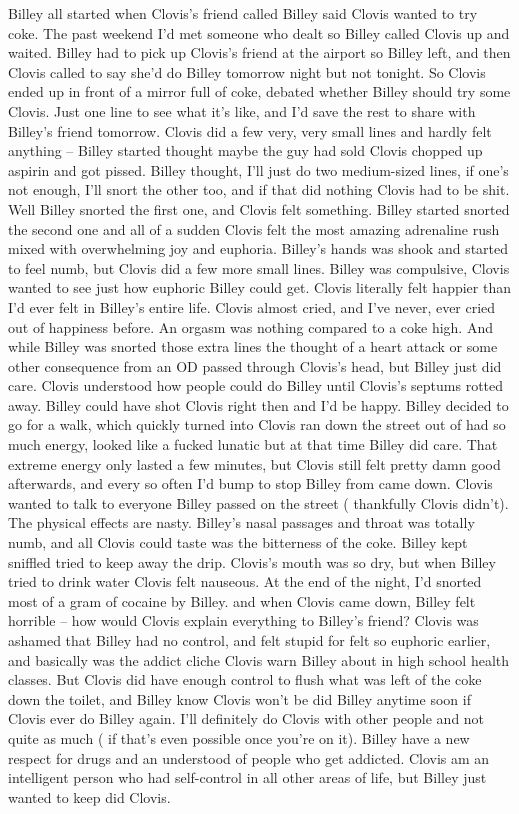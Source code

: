 \documentclass[12pt]{book}
\begin{document}
Billey all started when Clovis's friend called Billey said Clovis wanted to try coke. The past weekend I'd met someone who dealt so Billey called Clovis up and waited. Billey had to pick up Clovis's friend at the airport so Billey left, and then Clovis called to say she'd do Billey tomorrow night but not tonight. So Clovis ended up in front of a mirror full of coke, debated whether Billey should try some Clovis. Just one line to see what it's like, and I'd save the rest to share with Billey's friend tomorrow. Clovis did a few very, very small lines and hardly felt anything -- Billey started thought maybe the guy had sold Clovis chopped up aspirin and got pissed. Billey thought, I'll just do two medium-sized lines, if one's not enough, I'll snort the other too, and if that did nothing Clovis had to be shit. Well Billey snorted the first one, and Clovis felt something. Billey started snorted the second one and all of a sudden Clovis felt the most amazing adrenaline rush mixed with overwhelming joy and euphoria. Billey's hands was shook and started to feel numb, but Clovis did a few more small lines. Billey was compulsive, Clovis wanted to see just how euphoric Billey could get. Clovis literally felt happier than I'd ever felt in Billey's entire life. Clovis almost cried, and I've never, ever cried out of happiness before. An orgasm was nothing compared to a coke high. And while Billey was snorted those extra lines the thought of a heart attack or some other consequence from an OD passed through Clovis's head, but Billey just did care. Clovis understood how people could do Billey until Clovis's septums rotted away. Billey could have shot Clovis right then and I'd be happy. Billey decided to go for a walk, which quickly turned into Clovis ran down the street out of had so much energy, looked like a fucked lunatic but at that time Billey did care. That extreme energy only lasted a few minutes, but Clovis still felt pretty damn good afterwards, and every so often I'd bump to stop Billey from came down. Clovis wanted to talk to everyone Billey passed on the street ( thankfully Clovis didn't). The physical effects are nasty. Billey's nasal passages and throat was totally numb, and all Clovis could taste was the bitterness of the coke. Billey kept sniffled tried to keep away the drip. Clovis's mouth was so dry, but when Billey tried to drink water Clovis felt nauseous. At the end of the night, I'd snorted most of a gram of cocaine by Billey. and when Clovis came down, Billey felt horrible -- how would Clovis explain everything to Billey's friend? Clovis was ashamed that Billey had no control, and felt stupid for felt so euphoric earlier, and basically was the addict cliche Clovis warn Billey about in high school health classes. But Clovis did have enough control to flush what was left of the coke down the toilet, and Billey know Clovis won't be did Billey anytime soon if Clovis ever do Billey again. I'll definitely do Clovis with other people and not quite as much ( if that's even possible once you're on it). Billey have a new respect for drugs and an understood of people who get addicted. Clovis am an intelligent person who had self-control in all other areas of life, but Billey just wanted to keep did Clovis.
\end{document}
